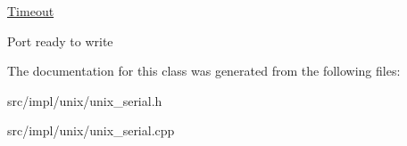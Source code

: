 \hyperlink{structserial_1_1_timeout}{Timeout}

Port ready to write 

The documentation for this class was generated from the following files\+:\begin{DoxyCompactItemize}
\item 
src/impl/unix/unix\+\_\+serial.\+h\item 
src/impl/unix/unix\+\_\+serial.\+cpp\end{DoxyCompactItemize}
